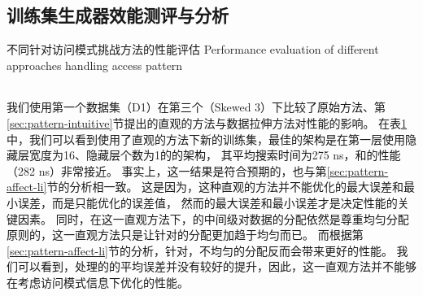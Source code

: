 \subsection{训练集生成器效能测评与分析}

\begin{table}[!hpb]
  \centering
  \bicaption[不同针对访问模式挑战方法的性能评估]
    {不同针对访问模式挑战方法的性能评估}
    {Performance evaluation of different approaches handling access pattern}
  \label{tab:pattern-sol}
  \begin{tabular}{@{}llr@{}} \toprule
  \end{tabular}
\end{table}

我们使用第一个数据集（D1）在第三个{\skewwl}（Skewed 3）下比较了原始方法、第\ref{sec:pattern-intuitive}节提出的直观的方法与数据拉伸方法对{\li}性能的影响。
在表\ref{tab:pattern-sol}中，我们可以看到使用了直观的方法下新的训练集，最佳的{\rmi}架构是在第一层使用隐藏层宽度为16、隐藏层个数为1的{\nn}的{\rmi}架构，
其平均搜索时间为275 ns，和{\li}的性能（282 ns）非常接近。
事实上，这一结果是符合预期的，也与第\ref{sec:pattern-affect-li}节的分析相一致。
这是因为，这种直观的方法并不能优化{\model}的最大误差和最小误差，而是只能优化{\hotkey}的误差值，
然而{\model}的最大误差和最小误差才是决定{\li}性能的关键因素。
同时，在这一直观方法下，{\rmi}的中间级对数据的分配依然是尊重均匀分配原则的，这一直观方法只是让针对{\hotkey}的分配更加趋于均匀而已。
而根据第\ref{sec:pattern-affect-li}节的分析，针对{\hotkey}，不均匀的分配反而会带来更好的性能。
我们可以看到，处理{\hotkey}的{\model}的平均误差并没有较好的提升，因此，这一直观方法并不能够在考虑访问模式信息下优化{\li}的性能。


